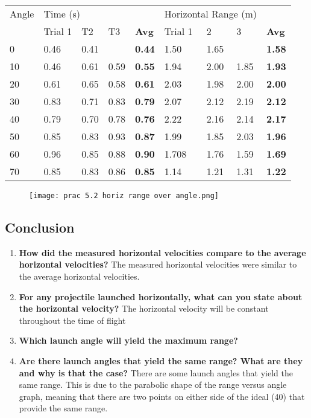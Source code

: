 		\begin{table}[htbp]
			\centering
			  \begin{tabular}{lllllllll}
			  Angle \textdegree & \multicolumn{4}{l}{Time (s)}      & \multicolumn{3}{l}{Horizontal Range (m)} &  \\
					& Trial 1 & T2    & T3    & \textbf{Avg} & Trial 1 & 2     & 3     & \textbf{Avg} \\
			  0     & 0.46  & 0.41  &       & \textbf{0.44} & 1.50  & 1.65  &       & \textbf{1.58} \\
			  10    & 0.46  & 0.61  & 0.59  & \textbf{0.55} & 1.94  & 2.00  & 1.85  & \textbf{1.93} \\
			  20    & 0.61  & 0.65  & 0.58  & \textbf{0.61} & 2.03  & 1.98  & 2.00  & \textbf{2.00} \\
			  30    & 0.83  & 0.71  & 0.83  & \textbf{0.79} & 2.07  & 2.12  & 2.19  & \textbf{2.12} \\
			  40    & 0.79  & 0.70  & 0.78  & \textbf{0.76} & 2.22  & 2.16  & 2.14  & \textbf{2.17} \\
			  50    & 0.85  & 0.83  & 0.93  & \textbf{0.87} & 1.99  & 1.85  & 2.03  & \textbf{1.96} \\
			  60    & 0.96  & 0.85  & 0.88  & \textbf{0.90} & 1.708 & 1.76  & 1.59  & \textbf{1.69} \\
			  70    & 0.85  & 0.83  & 0.86  & \textbf{0.85} & 1.14  & 1.21  & 1.31  & \textbf{1.22} \\
			  \end{tabular}
		\end{table}

		\begin{figure}[H]
			\centering
			\texttt{[image: prac 5.2 horiz range over angle.png]}
		\end{figure}

	\subsection{Conclusion}
		\begin{enumerate}
			\item \textbf{How did the measured horizontal velocities compare to the average horizontal velocities?}
				\subitem The measured horizontal velocities were similar to the average horizontal velocities.
			\item \textbf{For any projectile launched horizontally, what can you state about the horizontal velocity?}
				\subitem The horizontal velocity will be constant throughout the time of flight
			\item \textbf{Which launch angle will yield the maximum range?}
				\textdegree
			\item \textbf{Are there launch angles that yield the same range? What are they and why is that the case?}
				\subitem There are some launch angles that yield the same range. This is due to the parabolic shape of the range versus angle graph, meaning that there are two points on either side of the ideal (40\textdegree) that provide the same range.
		\end{enumerate}

